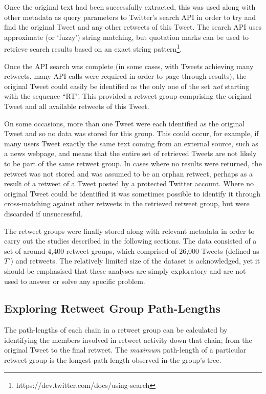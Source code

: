 Once the original text had been successfully extracted, this was used along with other metadata as query parameters to Twitter's search API in order to try and find the original Tweet and any other retweets of this Tweet. The search API uses approximate (or `fuzzy') string matching, but quotation marks can be used to retrieve search results based on an exact string pattern\footnote{https://dev.twitter.com/docs/using-search}.

Once the API search was complete (in some cases, with Tweets achieving many retweets, many API calls were required in order to page through results), the original Tweet could easily be identified as the only one of the set \textit{not} starting with the sequence ``RT''. This provided a retweet group comprising the original Tweet and all available retweets of this Tweet.

On some occasions, more than one Tweet were each identified as the original Tweet and so no data was stored for this group. This could occur, for example, if many users Tweet exactly the same text coming from an external source, such as a news webpage, and means that the entire set of retrieved Tweets are not likely to be part of the same retweet group. In cases where no results were returned, the retweet was not stored and was assumed to be an orphan retweet, perhaps as a result of a retweet of a Tweet posted by a protected Twitter account. Where no original Tweet could be identified it was sometimes possible to identify it through cross-matching against other retweets in the retrieved retweet group, but were discarded if unsuccessful.

The retweet groups were finally stored along with relevant metadata in order to carry out the studies described in the following sections. The data consisted of a set of around 4,400 retweet groups, which comprised of 26,000 Tweets (defined as $T'$)  and retweets. The relatively limited size of the dataset is acknowledged, yet it should be emphasised that these analyses are simply exploratory and are not used to answer or solve any specific problem.


\subsection{Exploring Retweet Group Path-Lengths}
\label{section:pathlength}
The path-lengths of each chain in a retweet group can be calculated by identifying the members involved in retweet activity down that chain; from the original Tweet to the final retweet. The \textit{maximum} path-length of a particular retweet group is the longest path-length observed in the group's tree.

